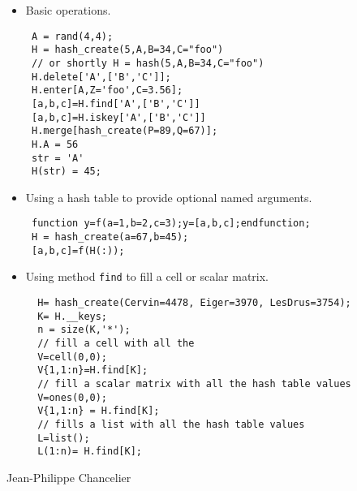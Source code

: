 \begin{examples}
\begin{itemize}
\item Basic operations.
\begin{Verbatim}
 A = rand(4,4);
 H = hash_create(5,A,B=34,C="foo")  
 // or shortly H = hash(5,A,B=34,C="foo")
 H.delete['A',['B','C']];
 H.enter[A,Z='foo',C=3.56];
 [a,b,c]=H.find['A',['B','C']]
 [a,b,c]=H.iskey['A',['B','C']]
 H.merge[hash_create(P=89,Q=67)];
 H.A = 56 
 str = 'A'
 H(str) = 45;
\end{Verbatim}
\item Using a hash table to provide optional named arguments.
\begin{Verbatim}
 function y=f(a=1,b=2,c=3);y=[a,b,c];endfunction;
 H = hash_create(a=67,b=45);
 [a,b,c]=f(H(:));
\end{Verbatim}
\item Using method \verb+find+ to fill a cell or scalar matrix.
\begin{Verbatim}
  H= hash_create(Cervin=4478, Eiger=3970, LesDrus=3754);
  K= H.__keys;
  n = size(K,'*');
  // fill a cell with all the 
  V=cell(0,0);
  V{1,1:n}=H.find[K];
  // fill a scalar matrix with all the hash table values 
  V=ones(0,0);
  V{1,1:n} = H.find[K];
  // fills a list with all the hash table values 
  L=list();
  L(1:n)= H.find[K];
\end{Verbatim}
\end{itemize}
\end{examples}

\begin{authors}
  Jean-Philippe Chancelier
\end{authors}
